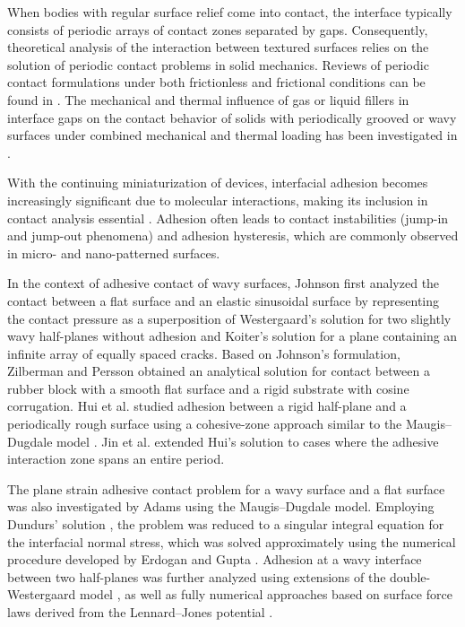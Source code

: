 When bodies with regular surface relief come into contact, the interface typically consists of periodic arrays of contact zones separated by gaps. Consequently, theoretical analysis of the interaction between textured surfaces relies on the solution of periodic contact problems in solid mechanics. Reviews of periodic contact formulations under both frictionless and frictional conditions can be found in \cite{Chumak4,Chumak16,Chumak45}. The mechanical and thermal influence of gas or liquid fillers in interface gaps on the contact behavior of solids with periodically grooved or wavy surfaces under combined mechanical and thermal loading has been investigated in \cite{Chumak8,Chumak9,Chumak12,Chumak26,Chumak27,Chumak28,Chumak31}.

With the continuing miniaturization of devices, interfacial adhesion becomes increasingly significant due to molecular interactions, making its inclusion in contact analysis essential \cite{Chumak12}. Adhesion often leads to contact instabilities (jump-in and jump-out phenomena) and adhesion hysteresis, which are commonly observed in micro- and nano-patterned surfaces.

In the context of adhesive contact of wavy surfaces, Johnson \cite{Chumak24} first analyzed the contact between a flat surface and an elastic sinusoidal surface by representing the contact pressure as a superposition of Westergaard’s solution \cite{Chumak43} for two slightly wavy half-planes without adhesion and Koiter’s solution \cite{Chumak25} for a plane containing an infinite array of equally spaced cracks. Based on Johnson’s formulation, Zilberman and Persson \cite{Chumak47} obtained an analytical solution for contact between a rubber block with a smooth flat surface and a rigid substrate with cosine corrugation. Hui et al. \cite{Chumak20} studied adhesion between a rigid half-plane and a periodically rough surface using a cohesive-zone approach similar to the Maugis–Dugdale model \cite{Chumak33}. Jin et al. \cite{Chumak22} extended Hui’s solution to cases where the adhesive interaction zone spans an entire period.

The plane strain adhesive contact problem for a wavy surface and a flat surface was also investigated by Adams \cite{Chumak1} using the Maugis–Dugdale model. Employing Dundurs’ solution \cite{Chumak13}, the problem was reduced to a singular integral equation for the interfacial normal stress, which was solved approximately using the numerical procedure developed by Erdogan and Gupta \cite{Chumak14}. Adhesion at a wavy interface between two half-planes was further analyzed using extensions of the double-Westergaard model \cite{Chumak18,Chumak23}, as well as fully numerical approaches based on surface force laws derived from the Lennard–Jones potential \cite{Chumak37,Chumak44}.

